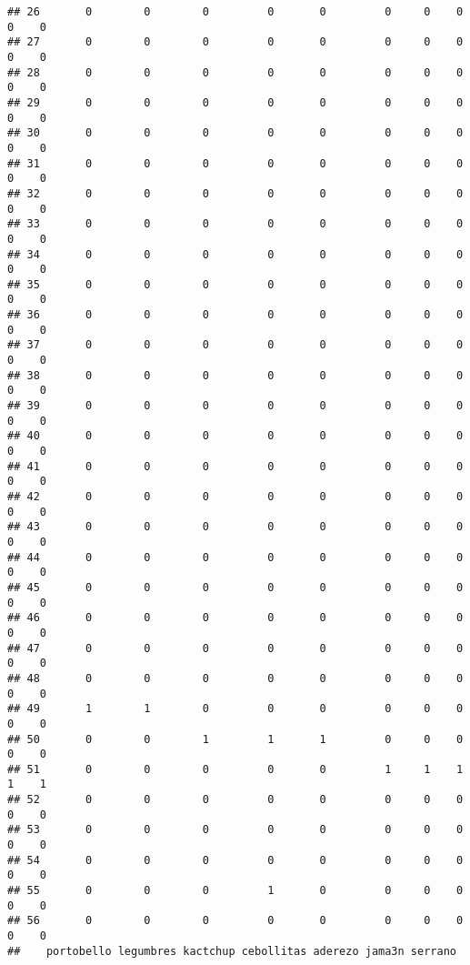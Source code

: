 \documentclass[
]{article}
\begin{document}
\begin{verbatim}
## 26       0        0        0         0       0         0     0    0      0    0
## 27       0        0        0         0       0         0     0    0      0    0
## 28       0        0        0         0       0         0     0    0      0    0
## 29       0        0        0         0       0         0     0    0      0    0
## 30       0        0        0         0       0         0     0    0      0    0
## 31       0        0        0         0       0         0     0    0      0    0
## 32       0        0        0         0       0         0     0    0      0    0
## 33       0        0        0         0       0         0     0    0      0    0
## 34       0        0        0         0       0         0     0    0      0    0
## 35       0        0        0         0       0         0     0    0      0    0
## 36       0        0        0         0       0         0     0    0      0    0
## 37       0        0        0         0       0         0     0    0      0    0
## 38       0        0        0         0       0         0     0    0      0    0
## 39       0        0        0         0       0         0     0    0      0    0
## 40       0        0        0         0       0         0     0    0      0    0
## 41       0        0        0         0       0         0     0    0      0    0
## 42       0        0        0         0       0         0     0    0      0    0
## 43       0        0        0         0       0         0     0    0      0    0
## 44       0        0        0         0       0         0     0    0      0    0
## 45       0        0        0         0       0         0     0    0      0    0
## 46       0        0        0         0       0         0     0    0      0    0
## 47       0        0        0         0       0         0     0    0      0    0
## 48       0        0        0         0       0         0     0    0      0    0
## 49       1        1        0         0       0         0     0    0      0    0
## 50       0        0        1         1       1         0     0    0      0    0
## 51       0        0        0         0       0         1     1    1      1    1
## 52       0        0        0         0       0         0     0    0      0    0
## 53       0        0        0         0       0         0     0    0      0    0
## 54       0        0        0         0       0         0     0    0      0    0
## 55       0        0        0         1       0         0     0    0      0    0
## 56       0        0        0         0       0         0     0    0      0    0
##    portobello legumbres kactchup cebollitas aderezo jama3n serrano

\end{verbatim}
\end{document}

